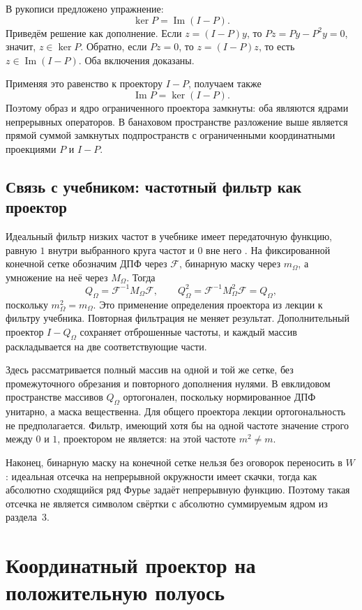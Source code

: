 \documentclass[12pt,a4paper]{article}
\theoremstyle{definition}
\theoremstyle{remark}
\begin{document}
В рукописи предложено упражнение:
\[
  \boxed{\ker P=\operatorname{Im}(I-P)}.
\]
Приведём решение как дополнение. Если $z=(I-P)y$, то
$Pz=Py-P^2y=0$, значит, $z\in\ker P$. Обратно, если $Pz=0$,
то $z=(I-P)z$, то есть $z\in\operatorname{Im}(I-P)$.
Оба включения доказаны.

Применяя это равенство к проектору $I-P$, получаем также
\[
  \operatorname{Im}P=\ker(I-P).
\]
Поэтому образ и ядро ограниченного проектора замкнуты: оба являются
ядрами непрерывных операторов. В банаховом пространстве разложение
выше является прямой суммой замкнутых подпространств с ограниченными
координатными проекциями $P$ и $I-P$.

\subsection{Связь с учебником: частотный фильтр как проектор}

Идеальный фильтр низких частот в учебнике имеет передаточную
функцию, равную $1$ внутри выбранного круга частот и $0$ вне него
\cite[\S\,4.8.1, с.~320--321]{GW2012}. На фиксированной конечной
сетке обозначим ДПФ через $\mathcal F$, бинарную маску через
$m_\Omega$, а умножение на неё через $M_\Omega$. Тогда
\[
  Q_\Omega=\mathcal F^{-1}M_\Omega\mathcal F,\qquad
  Q_\Omega^2=\mathcal F^{-1}M_\Omega^2\mathcal F=Q_\Omega,
\]
поскольку $m_\Omega^2=m_\Omega$. Это применение определения
проектора из лекции к фильтру учебника. Повторная фильтрация
не меняет результат. Дополнительный проектор $I-Q_\Omega$
сохраняет отброшенные частоты, и каждый массив раскладывается
на две соответствующие части.

Здесь рассматривается полный массив на одной и той же сетке,
без промежуточного обрезания и повторного дополнения нулями.
В евклидовом пространстве массивов $Q_\Omega$ ортогонален,
поскольку нормированное ДПФ унитарно, а маска вещественна.
Для общего проектора лекции ортогональность не предполагается.
Фильтр, имеющий хотя бы на одной частоте значение строго между
$0$ и $1$, проектором не является: на этой частоте $m^2\ne m$.

Наконец, бинарную маску на конечной сетке нельзя без оговорок
переносить в $W$: идеальная отсечка на непрерывной окружности
имеет скачки, тогда как абсолютно сходящийся ряд Фурье задаёт
непрерывную функцию. Поэтому такая отсечка не является символом
свёртки с абсолютно суммируемым ядром из раздела~3.

\section{Координатный проектор на положительную полуось}
\end{document}

